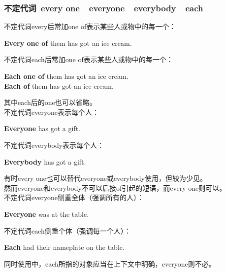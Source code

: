 \documentclass[UTF8]{ctexart}
\newcommand{\littf}[1]{{\hspace{3pt}\ttfamily #1}}
\begin{document}
\newpage

\subsubsection{不定代词~\littf{every one}~~\littf{everyone}~~\littf{everybody}~~\littf{each}}
    不定代词\littf{every}后常加\littf{one of}表示某些人或物中的每一个：
    \begin{center}
        \large\ttfamily
        \textbf{Every one of} them has got an ice cream.\\[6mm]
    \end{center}
    不定代词\littf{each}后常加\littf{one of}表示某些人或物中的每一个：
    \begin{center}
        \large\ttfamily
        \textbf{Each one of} them has got an ice cream.\\[3mm]
        \textbf{Each of} them has got an ice cream.\\[6mm]
    \end{center}
    其中\littf{each}后的\littf{one}也可以省略。\\[10mm]
    不定代词\littf{everyone}表示每个人：
    \begin{center}
        \large\ttfamily
        \textbf{Everyone} has got a gift.\\[6mm]
    \end{center}
    不定代词\littf{everybody}表示每个人：
    \begin{center}
        \large\ttfamily
        \textbf{Everybody} has got a gift.\\[6mm]
    \end{center}
    有时\littf{every one}也可以替代\littf{everyone}或\littf{everybody}使用，但较为少见。\\[3mm]
    然而\littf{everyone}和\littf{everybody}不可以后接\littf{of}引起的短语，而\littf{every one}则可以。\\[3mm]
    不定代词\littf{everyone}侧重全体（强调所有的人）：
    \begin{center}
        \large\ttfamily
        \textbf{Everyone} was at the table.\\[6mm]
    \end{center}
    不定代词\littf{each}侧重个体（强调每一个人）：
    \begin{center}
        \large\ttfamily
        \textbf{Each} had their nameplate on the table.\\[6mm]
    \end{center}
    同时使用中，\littf{each}所指的对象应当在上下文中明确，\littf{everyone}则不必。
\end{document}
